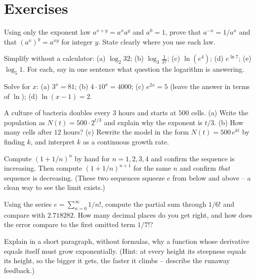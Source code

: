 \section{Exercises}

\begin{exercise}
Using only the exponent law $a^{x+y}=a^x a^y$ and $a^0=1$, prove that $a^{-x}=1/a^x$ and that $(a^x)^y = a^{xy}$ for integer $y$. State clearly where you use each law.
\end{exercise}

\begin{exercise}
Simplify without a calculator: (a) $\log_2 32$; (b) $\log_3 \tfrac{1}{27}$; (c) $\ln(e^4)$; (d) $e^{\ln 7}$; (e) $\log_5 1$. For each, say in one sentence what question the logarithm is answering.
\end{exercise}

\begin{exercise}
Solve for $x$: (a) $3^{x}=81$; (b) $4\cdot 10^{x}=4000$; (c) $e^{2x}=5$ (leave the answer in terms of $\ln$); (d) $\ln(x-1)=2$.
\end{exercise}

\begin{exercise}
A culture of bacteria doubles every $3$ hours and starts at $500$ cells. (a) Write the population as $N(t)=500\cdot 2^{t/3}$ and explain why the exponent is $t/3$. (b) How many cells after $12$ hours? (c) Rewrite the model in the form $N(t)=500\,e^{kt}$ by finding $k$, and interpret $k$ as a continuous growth rate.
\end{exercise}

\begin{exercise}
Compute $(1+1/n)^n$ by hand for $n=1,2,3,4$ and confirm the sequence is increasing. Then compute $(1+1/n)^{n+1}$ for the same $n$ and confirm \emph{that} sequence is decreasing. (These two sequences squeeze $e$ from below and above -- a clean way to see the limit exists.)
\end{exercise}

\begin{exercise}
Using the series $e=\sum_{n=0}^{\infty}1/n!$, compute the partial sum through $1/6!$ and compare with $2.718282$. How many decimal places do you get right, and how does the error compare to the first omitted term $1/7!$?
\end{exercise}

\begin{exercise}[Conceptual]
Explain in a short paragraph, without formulas, why a function whose derivative equals itself must grow exponentially. (Hint: at every height its steepness equals its height, so the bigger it gets, the faster it climbs -- describe the runaway feedback.)
\end{exercise}

